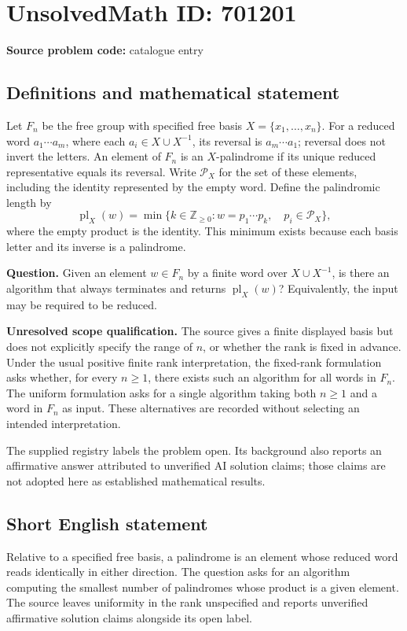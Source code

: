 \documentclass[11pt]{article}
\begin{document}
\section*{UnsolvedMath ID: 701201}
\textbf{Source problem code:} catalogue entry
\subsection{Definitions and mathematical statement}
Let \(F_n\) be the free group with specified free basis \(X=\{x_1,\ldots,x_n\}\). For a reduced word \(a_1\cdots a_m\), where each \(a_i\in X\cup X^{-1}\), its reversal is \(a_m\cdots a_1\); reversal does not invert the letters. An element of \(F_n\) is an \(X\)-palindrome if its unique reduced representative equals its reversal. Write \(\mathcal P_X\) for the set of these elements, including the identity represented by the empty word. Define the palindromic length by
\[
\operatorname{pl}_X(w)=\min\bigl\{k\in\mathbb Z_{\geq 0}:w=p_1\cdots p_k,\quad p_i\in\mathcal P_X\bigr\},
\]
where the empty product is the identity. This minimum exists because each basis letter and its inverse is a palindrome.

\textbf{Question.} Given an element \(w\in F_n\) by a finite word over \(X\cup X^{-1}\), is there an algorithm that always terminates and returns \(\operatorname{pl}_X(w)\)? Equivalently, the input may be required to be reduced.

\textbf{Unresolved scope qualification.} The source gives a finite displayed basis but does not explicitly specify the range of \(n\), or whether the rank is fixed in advance. Under the usual positive finite rank interpretation, the fixed-rank formulation asks whether, for every \(n\geq 1\), there exists such an algorithm for all words in \(F_n\). The uniform formulation asks for a single algorithm taking both \(n\geq 1\) and a word in \(F_n\) as input. These alternatives are recorded without selecting an intended interpretation.

The supplied registry labels the problem open. Its background also reports an affirmative answer attributed to unverified AI solution claims; those claims are not adopted here as established mathematical results.
\subsection{Short English statement}
Relative to a specified free basis, a palindrome is an element whose reduced word reads identically in either direction. The question asks for an algorithm computing the smallest number of palindromes whose product is a given element. The source leaves uniformity in the rank unspecified and reports unverified affirmative solution claims alongside its open label.
\end{document}
